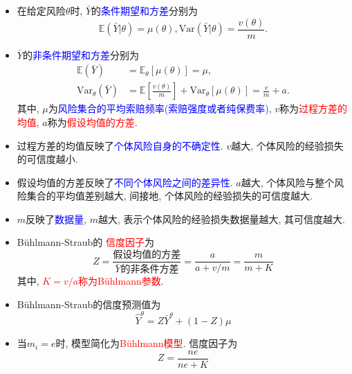 \documentclass[professionalfont]{beamer}
\def\E{{\mathbb E}}  %
\newcommand{\red}[1]{\textcolor{red}{#1}}
\newcommand{\blue}[1]{\textcolor{blue}{#1}}
\begin{document}
\begin{frame}
\begin{itemize}
\item 在给定风险$\theta$时, $\bar{Y}$的\blue{条件期望和方差}分别为
\begin{equation}
\E(\bar{Y}|\theta)=\mu(\theta), \text{Var}(\bar{Y}|\theta)=\frac{v(\theta)}{m}.
\end{equation}
\item $\bar{Y}$的\blue{非条件期望和方差}分别为
\begin{equation}
\begin{aligned}
\E(\bar{Y})&=\E_\theta\left[\mu(\theta)\right]=\mu,\\
\text{Var}_\theta(\bar{Y})&=\E\left[\frac{v(\theta)}{m}\right]+\text{Var}_\theta\left[\mu(\theta) \right]=\frac{v}{m}+a.
\end{aligned}
\end{equation}
其中, $\mu$为\blue{风险集合的平均索赔频率(索赔强度或者纯保费率)}, $v$称为\red{过程方差的均值},  $a$称为\red{假设均值的方差}.
\end{itemize}
\end{frame}

\begin{frame}
\begin{itemize}
\item 过程方差的均值反映了\blue{个体风险自身的不确定性}. $v$越大, 个体风险的经验损失的可信度越小.
\item 假设均值的方差反映了\blue{不同个体风险之间的差异性}. $a$越大, 个体风险与整个风险集合的平均值差别越大, 间接地, 个体风险的经验损失的可信度越大.
\item $m$反映了\blue{数据量}, $m$越大, 表示个体风险的经验损失数据量越大, 其可信度越大.
\end{itemize}
\end{frame}

\begin{frame}
\begin{itemize}
\item B\"uhlmann-Straub的 \red{信度因子}为
\begin{equation}
Z=\frac{\text{假设均值的方差}}{\bar{Y}\text{的非条件方差}}=\frac{a}{a+v/m}=\frac{m}{m+K}
\end{equation}
其中, \red{$K=v/a$称为B\"uhlmann参数}.
\item  B\"uhlmann-Straub的信度预测值为
$$\hat{Y}^\theta=Z\bar{Y}^\theta+(1-Z)\mu$$
\item 当$m_i=e$时, 模型简化为\red{B\"uhlmann模型}. 信度因子为$$Z=\frac{ne}{ne+K}$$
\end{itemize}
\end{frame}
\end{document}
